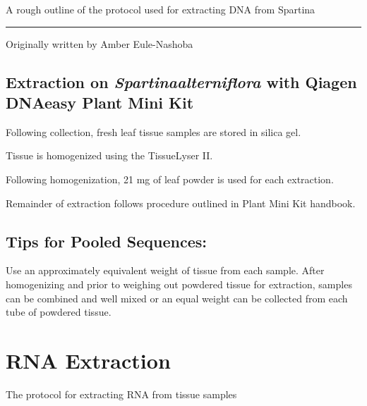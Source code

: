 \documentclass[
  letterpaper,
  DIV=11,
  numbers=noendperiod]{scrreprt}
\begin{document}
A rough outline of the protocol used for extracting DNA from Spartina

\begin{center}\rule{0.5\linewidth}{0.5pt}\end{center}

Originally written by Amber Eule-Nashoba

\hypertarget{extraction-on-spartinaalterniflora-with-qiagen-dnaeasy-plant-mini-kit}{%
\section*{\texorpdfstring{\textbf{Extraction on
\emph{Spartinaalterniflora} with Qiagen DNAeasy Plant Mini
Kit}}{Extraction on Spartinaalterniflora with Qiagen DNAeasy Plant Mini Kit}}\label{extraction-on-spartinaalterniflora-with-qiagen-dnaeasy-plant-mini-kit}}

Following collection, fresh leaf tissue samples are stored in silica
gel.

Tissue is homogenized using the TissueLyser II.

Following homogenization, 21 mg of leaf powder is used for each
extraction.

Remainder of extraction follows procedure outlined in Plant Mini Kit
handbook.

\hypertarget{tips-for-pooled-sequences}{%
\section*{\texorpdfstring{\textbf{Tips for Pooled
Sequences:}}{Tips for Pooled Sequences:}}\label{tips-for-pooled-sequences}}

Use an approximately equivalent weight of tissue from each sample. After
homogenizing and prior to weighing out powdered tissue for extraction,
samples can be combined and well mixed or an equal weight can be
collected from each tube of powdered tissue.\\

\hypertarget{rna-extraction}{%
\chapter{RNA Extraction}\label{rna-extraction}}

The protocol for extracting RNA from tissue samples
\end{document}

